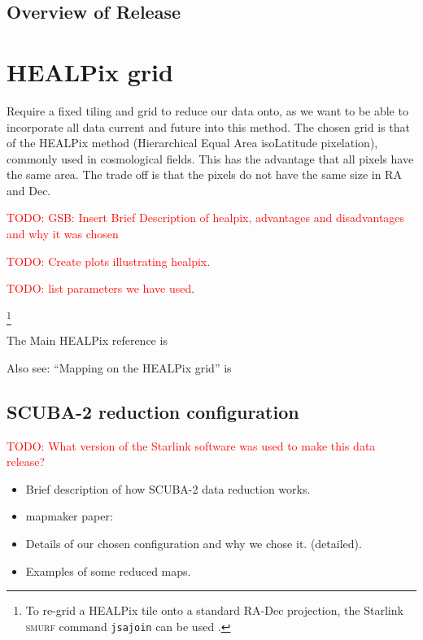 \documentclass[usenatbib]{mn2e}
\newcommand{\todo}[1]{\textcolor{red}{TODO: #1}}
\begin{document}
\subsection{Overview of Release}







\section{HEALPix grid }
Require a fixed tiling and grid to reduce our data onto, as we want to
be able to incorporate all data current and future into this
method. The chosen grid is that of the HEALPix method (Hierarchical
Equal Area isoLatitude pixelation), commonly used in cosmological
fields. This has the advantage that all pixels have the same area. The
trade off is that the pixels do not have the same size in RA and Dec.

\todo{GSB: Insert Brief Description of healpix, advantages and
  disadvantages and why it was chosen }

\todo{Create plots illustrating healpix}.

\todo{list parameters we have used}.

\footnote{To re-grid a HEALPix tile onto a standard RA-Dec projection,
  the Starlink \textsc{smurf} command \texttt{jsajoin} can be used
  \citep{SUN258}.}

The Main HEALPix reference is \citep{2005ApJ...622..759G}

Also see: ``Mapping on the HEALPix grid'' is \citep{2007MNRAS.381..865C}



\subsection{SCUBA-2 reduction configuration}

\todo{What version of the Starlink software was used to make this data
release?}

\citep{2013MNRAS.430.2513H}

\begin{itemize}
\item Brief description of how SCUBA-2 data reduction works.
\item mapmaker paper: \citep{2013MNRAS.430.2545C}
\item Details of our chosen configuration and why we chose it. (detailed).
\item Examples of some reduced maps.
\end{itemize}
\end{document}
